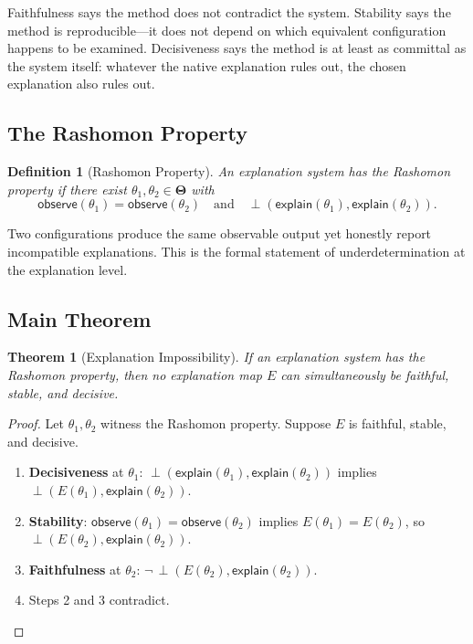 \documentclass[twocolumn]{article}
\newtheorem{theorem}{Theorem}
\newtheorem{definition}{Definition}
\newcommand{\Params}{\mathbf{\Theta}}
\newcommand{\incomp}{\perp}
\begin{document}
\noindent
Faithfulness says the method does not contradict the system. Stability says
the method is reproducible---it does not depend on which equivalent
configuration happens to be examined. Decisiveness says the method is at
least as committal as the system itself: whatever the native explanation
rules out, the chosen explanation also rules out.

\subsection{The Rashomon Property}

\begin{definition}[Rashomon Property]
\label{def:rashomon}
An explanation system has the \emph{Rashomon property} if there exist
$\theta_1, \theta_2 \in \Params$ with
\[
  \mathsf{observe}(\theta_1) = \mathsf{observe}(\theta_2)
  \quad\text{and}\quad
  \incomp(\mathsf{explain}(\theta_1), \mathsf{explain}(\theta_2)).
\]
\end{definition}

\noindent
Two configurations produce the same observable output yet honestly report
incompatible explanations. This is the formal statement of
underdetermination at the explanation level.

\subsection{Main Theorem}

\begin{theorem}[Explanation Impossibility]
\label{thm:universal}
If an explanation system has the Rashomon property, then no explanation
map $E$ can simultaneously be faithful, stable, and decisive.
\end{theorem}

\begin{proof}
Let $\theta_1, \theta_2$ witness the Rashomon property.
Suppose $E$ is faithful, stable, and decisive.
\begin{enumerate}
  \item \textbf{Decisiveness} at $\theta_1$:
    $\incomp(\mathsf{explain}(\theta_1), \mathsf{explain}(\theta_2))$
    implies $\incomp(E(\theta_1), \mathsf{explain}(\theta_2))$.
  \item \textbf{Stability}:
    $\mathsf{observe}(\theta_1) = \mathsf{observe}(\theta_2)$
    implies $E(\theta_1) = E(\theta_2)$, so
    $\incomp(E(\theta_2), \mathsf{explain}(\theta_2))$.
  \item \textbf{Faithfulness} at $\theta_2$:
    $\neg\,\incomp(E(\theta_2), \mathsf{explain}(\theta_2))$.
  \item Steps 2 and 3 contradict. \qedhere
\end{enumerate}
\end{proof}
\end{document}
